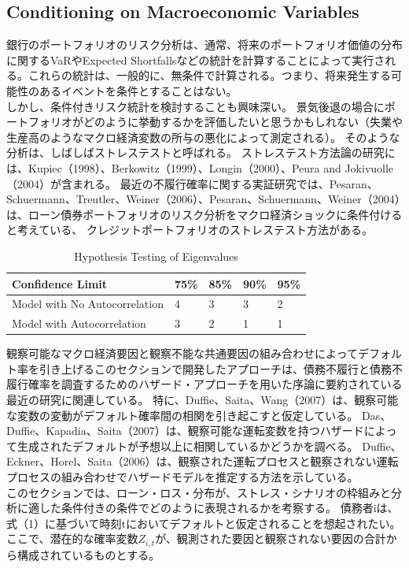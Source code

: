 \documentclass[a4j,12pt]{jarticle}
\begin{document}
\subsection{Conditioning  on  Macroeconomic Variables}
銀行のポートフォリオのリスク分析は、通常、将来のポートフォリオ価値の分布に関するVaRやExpected Shortfallsなどの統計を計算することによって実行される。これらの統計は、一般的に、無条件で計算される。つまり、将来発生する可能性のあるイベントを条件とすることはない。\\
しかし、条件付きリスク統計を検討することも興味深い。 景気後退の場合にポートフォリオがどのように挙動するかを評価したいと思うかもしれない（失業や生産高のようなマクロ経済変数の所与の悪化によって測定される）。 そのような分析は、しばしばストレステストと呼ばれる。 ストレステスト方法論の研究には、Kupiec（1998）、Berkowitz（1999）、Longin（2000）、Peura and Jokivuolle（2004）が含まれる。 最近の不履行確率に関する実証研究では、Pesaran、Schuermann、Treutler、Weiner（2006）、Pesaran、Schuermann、Weiner（2004）は、ローン債券ポートフォリオのリスク分析をマクロ経済ショックに条件付けると考えている、 クレジットポートフォリオのストレステスト方法がある。
\begin{table}[H]
\centering
\caption{Hypothesis Testing of Eigenvalues}
\label{my-label}
\begin{tabular}{|l|l|l|l|l|}
\hline
Confidence Limit              & 75\% & 85\% & 90\% & 95\% \\ \hline
Model with No Autocorrelation & 4    & 3    & 3    & 2    \\ \hline
Model with Autocorrelation    & 3    & 2    & 1    & 1    \\ \hline
\end{tabular}
\end{table}
観察可能なマクロ経済要因と観察不能な共通要因の組み合わせによってデフォルト率を引き上げるこのセクションで開発したアプローチは、債務不履行と債務不履行確率を調査するためのハザード・アプローチを用いた序論に要約されている最近の研究に関連している。 特に、Duffie、Saita、Wang（2007）は、観察可能な変数の変動がデフォルト確率間の相関を引き起こすと仮定している。 Das、Duffie、Kapadia、Saita（2007）は、観察可能な運転変数を持つハザードによって生成されたデフォルトが予想以上に相関しているかどうかを調べる。 Duffie、Eckner、Horel、Saita（2006）は、観察された運転プロセスと観察されない運転プロセスの組み合わせでハザードモデルを推定する方法を示している。\\
このセクションでは、ローン・ロス・分布が、ストレス・シナリオの枠組みと分析に適した条件付きの条件でどのように表現されるかを考察する。 債務者iは、式（1）に基づいて時刻tにおいてデフォルトと仮定されることを想起されたい。 ここで、潜在的な確率変数$Z_{i,t}$が、観測された要因と観察されない要因の合計から構成されているものとする。
\end{document}
